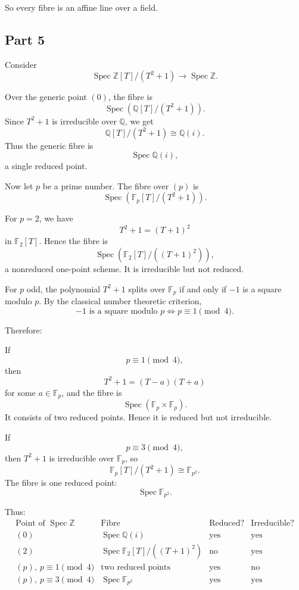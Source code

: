 \documentclass[12pt,a4paper]{article}
\theoremstyle{notespace}
\begin{document}
So every fibre is an affine line over a field.

\subsection{Part 5}

Consider
\[
\operatorname{Spec}\mathbb{Z}[T]/(T^2+1)
\longrightarrow
\operatorname{Spec}\mathbb{Z}.
\]

Over the generic point \((0)\), the fibre is
\[
\operatorname{Spec}
\left(
\mathbb{Q}[T]/(T^2+1)
\right).
\]
Since \(T^2+1\) is irreducible over \(\mathbb{Q}\), we get
\[
\mathbb{Q}[T]/(T^2+1)\cong \mathbb{Q}(i).
\]
Thus the generic fibre is
\[
\operatorname{Spec}\mathbb{Q}(i),
\]
a single reduced point.

Now let \(p\) be a prime number. The fibre over \((p)\) is
\[
\operatorname{Spec}
\left(
\mathbb{F}_p[T]/(T^2+1)
\right).
\]

For \(p=2\), we have
\[
T^2+1=(T+1)^2
\]
in \(\mathbb{F}_2[T]\). Hence the fibre is
\[
\operatorname{Spec}\left(\mathbb{F}_2[T]/((T+1)^2)\right),
\]
a nonreduced one-point scheme. It is irreducible but not reduced.

For \(p\) odd, the polynomial \(T^2+1\) splits over \(\mathbb{F}_p\) if
and only if \(-1\) is a square modulo \(p\). By the classical number
theoretic criterion,
\[
-1 \text{ is a square modulo }p
\iff
p\equiv 1 \pmod 4.
\]

Therefore:

If
\[
p\equiv 1 \pmod 4,
\]
then
\[
T^2+1=(T-a)(T+a)
\]
for some \(a\in \mathbb{F}_p\), and the fibre is
\[
\operatorname{Spec}(\mathbb{F}_p\times \mathbb{F}_p).
\]
It consists of two reduced points. Hence it is reduced but not
irreducible.

If
\[
p\equiv 3 \pmod 4,
\]
then \(T^2+1\) is irreducible over \(\mathbb{F}_p\), so
\[
\mathbb{F}_p[T]/(T^2+1)\cong \mathbb{F}_{p^2}.
\]
The fibre is one reduced point:
\[
\operatorname{Spec}\mathbb{F}_{p^2}.
\]

Thus:
\[
\begin{array}{c|c|c|c}
	\text{Point of }\operatorname{Spec}\mathbb{Z}
	&
	\text{Fibre}
	&
	\text{Reduced?}
	&
	\text{Irreducible?}
	\\
	\hline
	(0)
	&
	\operatorname{Spec}\mathbb{Q}(i)
	&
	\text{yes}
	&
	\text{yes}
	\\
	(2)
	&
	\operatorname{Spec}\mathbb{F}_2[T]/((T+1)^2)
	&
	\text{no}
	&
	\text{yes}
	\\
	(p),\ p\equiv 1\pmod 4
	&
	\text{two reduced points}
	&
	\text{yes}
	&
	\text{no}
	\\
	(p),\ p\equiv 3\pmod 4
	&
	\operatorname{Spec}\mathbb{F}_{p^2}
	&
	\text{yes}
	&
	\text{yes}
\end{array}
\]
\end{document}
